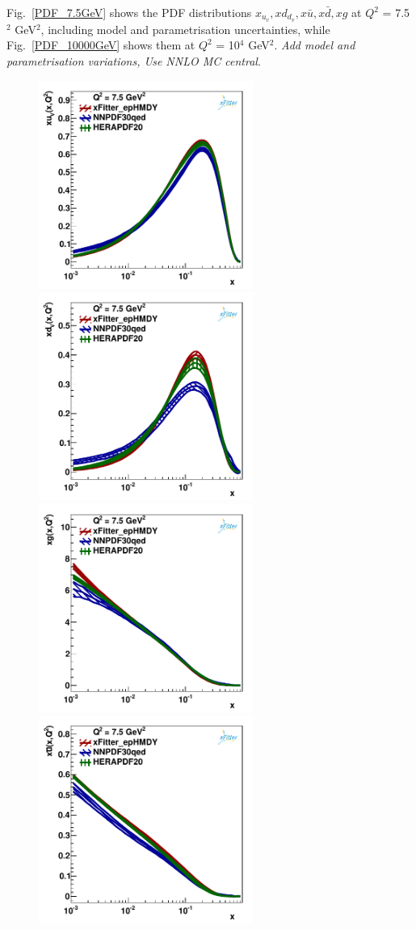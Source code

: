 Fig.~\ref{PDF_7.5GeV}
 shows the PDF distributions $x_{u_v},xd_{d_v},x\bar{u}, x\bar{d}, xg$ at $Q^{2}$ = 7.5$^{2}$ GeV$^{2}$,
including model and parametrisation uncertainties, while  Fig.~\ref{PDF_10000GeV} 
shows them at $Q^{2}$ = 10$^{4}$ GeV$^{2}$. {\it Add model and parametrisation variations, Use NNLO MC central}.
\begin{figure}
\includegraphics[width=7cm]{uv_7_5.pdf} 
\includegraphics[width=7cm]{dv_7_5.pdf} 
\includegraphics[width=7cm]{gluon_7_5.pdf} 
\includegraphics[width=7cm]{ubar_7_5.pdf} 

\end{figure}
